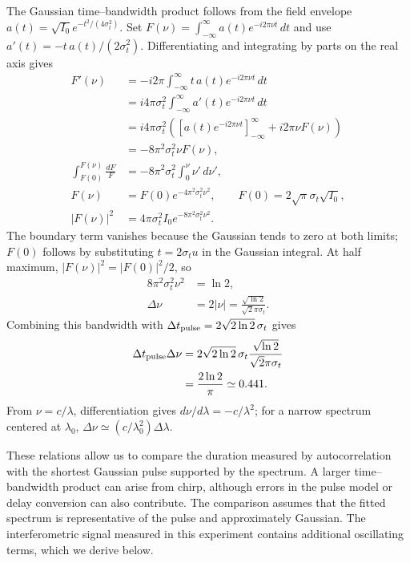 \documentclass[11pt,a4paper]{article}
\begin{document}
The Gaussian time--bandwidth product follows from the field envelope $a(t)=\sqrt{I_0}e^{-t^2/(4\sigma_t^2)}$. Set $F(\nu)=\int_{-\infty}^{\infty}a(t)e^{-i2\pi\nu t}\,dt$ and use $a'(t)=-t\,a(t)/(2\sigma_t^2)$. Differentiating and integrating by parts on the real axis gives
\begin{align}
F'(\nu)&=-i2\pi\int_{-\infty}^{\infty}t\,a(t)e^{-i2\pi\nu t}\,dt\\
&=i4\pi\sigma_t^2\int_{-\infty}^{\infty}a'(t)e^{-i2\pi\nu t}\,dt\\
&=i4\pi\sigma_t^2\left([a(t)e^{-i2\pi\nu t}]_{-\infty}^{\infty}+i2\pi\nu F(\nu)\right)\\
&=-8\pi^2\sigma_t^2\nu F(\nu),\\
\int_{F(0)}^{F(\nu)}\frac{dF}{F}&=-8\pi^2\sigma_t^2\int_0^\nu\nu'\,d\nu',\\
F(\nu)&=F(0)e^{-4\pi^2\sigma_t^2\nu^2},\qquad
F(0)=2\sqrt{\pi}\sigma_t\sqrt{I_0},\\
|F(\nu)|^2&=4\pi\sigma_t^2I_0e^{-8\pi^2\sigma_t^2\nu^2}.
\end{align}
The boundary term vanishes because the Gaussian tends to zero at both limits; $F(0)$ follows by substituting $t=2\sigma_t u$ in the Gaussian integral.
At half maximum, $|F(\nu)|^2=|F(0)|^2/2$, so
\begin{align}
8\pi^2\sigma_t^2\nu^2&=\ln2,\\
\Delta\nu&=2|\nu|=\frac{\sqrt{\ln2}}{\sqrt{2}\pi\sigma_t}.
\end{align}
Combining this bandwidth with $\Delta t_{\rm pulse}=2\sqrt{2\ln2}\,\sigma_t$ gives
\begin{align}
\Delta t_{\rm pulse}\Delta\nu
&=2\sqrt{2\ln2}\,\sigma_t\frac{\sqrt{\ln2}}{\sqrt{2}\pi\sigma_t}\\
&=\frac{2\ln2}{\pi}\simeq0.441.
\end{align}
From $\nu=c/\lambda$, differentiation gives $d\nu/d\lambda=-c/\lambda^2$; for a narrow spectrum centered at $\lambda_0$, $\Delta\nu\simeq(c/\lambda_0^2)\Delta\lambda$.

These relations allow us to compare the duration measured by autocorrelation with the shortest Gaussian pulse supported by the spectrum. A larger time--bandwidth product can arise from chirp, although errors in the pulse model or delay conversion can also contribute. The comparison assumes that the fitted spectrum is representative of the pulse and approximately Gaussian. The interferometric signal measured in this experiment contains additional oscillating terms, which we derive below.
\end{document}
